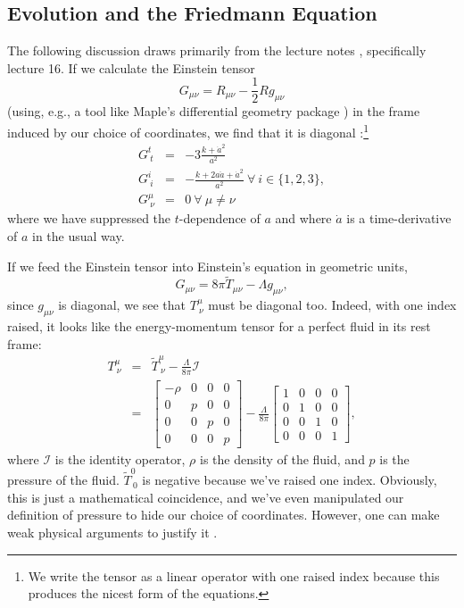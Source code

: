 \documentclass[]{article}
\begin{document}
\subsection{Evolution and the Friedmann Equation}
\label{subsec:metric:evolution}

The following discussion draws primarily from the lecture notes
\cite{Kempf}, specifically lecture 16. If we calculate the Einstein
tensor
\begin{equation}
  \label{eq:def:einstein:tensor}
  G_{\mu\nu} = R_{\mu\nu} - \frac{1}{2} R g_{\mu\nu}
\end{equation}
(using, e.g., a tool like Maple's differential geometry package
\cite{Maple}) in the frame induced by our choice of coordinates, we
find that it is diagonal \cite{Kempf}:\footnote{We write the tensor as
  a linear operator with one raised index because this produces the
  nicest form of the equations.}
\begin{eqnarray}
  \label{eq:einstein:tensor:calculated:tt}
  G^t_{\ t} &=& -3 \frac{k + \dot{a}^2}{a^2}\\
  \label{eq:einstein:tensor:calculated:space}
  G^i_{\ i} &=& - \frac{k + 2a\ddot{a} + \dot{a}^2}{a^2} \ \forall\ i\in\{1,2,3\},\\
  \label{eq:einstein:tensor:off:diagonal}
  G^{\mu}_{\ \nu} &=& 0\  \forall\ \mu\neq\nu
\end{eqnarray}
where we have suppressed the $t$-dependence of $a$ and where $\dot{a}$
is a time-derivative of $a$ in the usual way. 

If we feed the Einstein tensor into Einstein's equation in geometric units,
\begin{equation}
  \label{eq:einsteins:equation:1}
  G_{\mu \nu} = 8\pi \tilde{T}_{\mu\nu} - \Lambda g_{\mu\nu},
\end{equation}
since $g_{\mu\nu}$ is diagonal, we see that $T^\mu_{\ \nu}$ must be
diagonal too. Indeed, with one index raised, it looks like the
energy-momentum tensor for a perfect fluid in its rest frame:
\begin{eqnarray}
  T^{\mu}_{\ \nu} &=& \tilde{T}^{\mu}_{\ \nu} - \frac{\Lambda}{8\pi}\mathcal{I}\nonumber\\
  \label{eq:T:mu:nu}
  &=& \left[\begin{array}{cccc}-\rho&0&0&0\\0&p&0&0\\0&0&p&0\\0&0&0&p\end{array}\right] - \frac{\Lambda}{8\pi} \left[\begin{array}{cccc}1&0&0&0\\0&1&0&0\\0&0&1&0\\0&0&0&1\end{array}\right],
\end{eqnarray}
where $\mathcal{I}$ is the identity operator, $\rho$ is the density of
the fluid, and $p$ is the pressure of the fluid. $\tilde{T}^0_{\ 0}$
is negative because we've raised one index. Obviously, this is just a
mathematical coincidence, and we've even manipulated our definition of
pressure to hide our choice of coordinates. However, one can make weak
physical arguments to justify it \cite{Carroll,MisnerThorneWheeler}.
\end{document}
